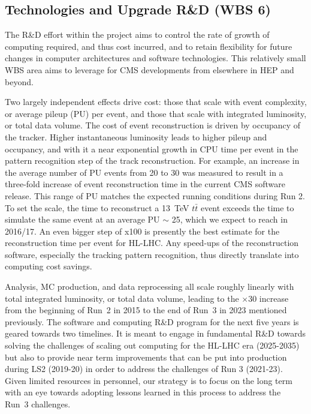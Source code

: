 \documentclass[11pt,a4paper]{article}
\begin{document}
\subsection{Technologies and Upgrade R\&D (WBS 6)}

The R\&D effort within the project aims to control the rate of growth of 
computing required, and thus cost incurred, and to retain flexibility for 
future changes in computer architectures and software technologies. This 
relatively small WBS area aims to leverage for CMS developments from 
elsewhere in HEP and beyond. 

Two largely independent effects drive cost:
those that scale with event complexity, or average pileup (PU) per event, 
and those that scale with integrated luminosity, or total data volume.
The cost of event reconstruction is driven by occupancy of the tracker.
Higher instantaneous luminosity leads to higher pileup and occupancy, and
with it a near exponential growth in CPU time per event in the pattern
recognition step of the track reconstruction.  For example, an increase in
the average number of PU events from 20 to 30 was measured to result in a
three-fold increase of event reconstruction time in the current CMS software
release.  This range of PU matches the expected running conditions during
Run 2.  To set the scale, the time to reconstruct a 13~TeV $t\bar{t}$ event
exceeds the time to simulate the same event at an average PU $\sim$ 25,
which we expect to reach in 2016/17.  
%
An even bigger step of x100 is presently
the best estimate for the reconstruction time per event for HL-LHC.
%
Any speed-ups of the
reconstruction software, especially the tracking pattern recognition, thus
directly translate into computing cost savings. 

Analysis, MC production, and data reprocessing all scale roughly linearly
with total integrated luminosity, or total data volume, leading to the
$\times 30$ increase from the beginning of Run~2 in 2015 to the end of
Run~3 in 2023 mentioned previously.  The software and computing R\&D program
for the next five years is geared towards two timelines. It is meant to engage
in fundamental R\&D towards solving the challenges of scaling out computing
for the HL-LHC era (2025-2035) but also to provide near term
improvements that can be put into production during LS2 (2019-20) in order
to address the challenges of Run 3 (2021-23). Given limited resources in
personnel, our strategy is to focus on the long term with an eye towards
adopting lessons learned in this process to address the Run~3 challenges.
\end{document}
